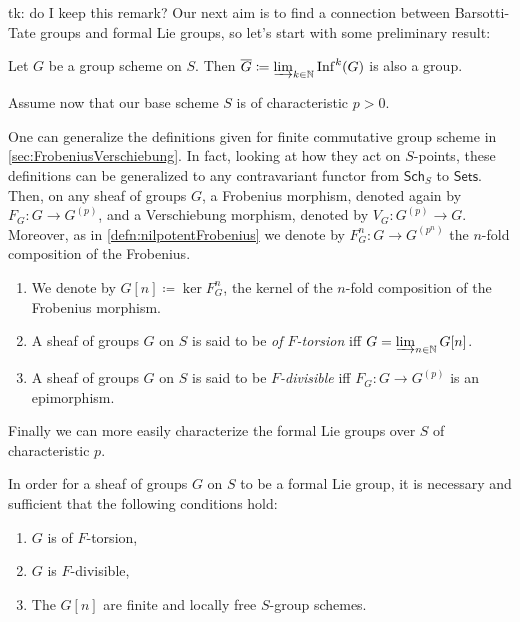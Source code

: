 \documentclass[../Main]{subfiles}
\begin{document}
tk: do I keep this remark?
Our next aim is to find a connection between Barsotti-Tate groups and formal Lie groups,
so let's start with some preliminary result:
\begin{lem}
	Let $G$ be a group scheme on $S$.
	Then $\overline{G} \coloneqq \varinjlim_{k \in \mathbb{N}} \mathrm{Inf}^k(G)$
	is also a group.
\end{lem}


Assume now that our base scheme $S$ is of characteristic $p  > 0$.
\begin{rem}
One can generalize the definitions given for finite commutative group scheme
in \cref{sec:FrobeniusVerschiebung}.
In fact, looking at how they act on $S$-points, these
definitions can be generalized to any contravariant functor
from $\mathsf{Sch}_{ S }$ to $\mathsf{Sets}$.
Then, on any sheaf of groups $G$, a Frobenius morphism,
denoted again by $F_G\colon G \to G^{(p)}$, 
and a Verschiebung morphism, denoted by $V_G \colon G^{(p)} \to G$.
Moreover, as in \cref{defn:nilpotentFrobenius} we denote by
$F^n_G\colon G \to G^{(p^n)}$ the $n$-fold composition
of the Frobenius.
\end{rem}


\begin{defn}[]\leavevmode\vspace{-.2\baselineskip}
\begin{enumerate}
\item We denote by $G[n] \coloneqq \ker F^n_G$, the kernel of the $n$-fold composition
	of the Frobenius morphism.

\item A sheaf of groups $G$ on $S$ is said to be {\em of $F$-torsion} iff
	$G = \varinjlim_{n \in \mathbb{N}} G[n]$.

\item A sheaf of groups $G$ on $S$ is said to be {\em $F$-divisible} iff
	$F_G\colon G \to G^{(p)}$ is an epimorphism.
\end{enumerate}
\end{defn}

Finally we can more easily characterize the formal Lie groups over
$S$ of characteristic $p$.
\begin{thm}
	In order for a sheaf of groups $G$ on $S$ to be a formal Lie group,
	it is necessary and sufficient that the following conditions hold:
\begin{enumerate}
	\item $G$ is of $F$-torsion,
	\item $G$ is $F$-divisible,
	\item The $G[n]$ are finite and locally free $S$-group schemes.
\end{enumerate}
\end{thm}
\end{document}
